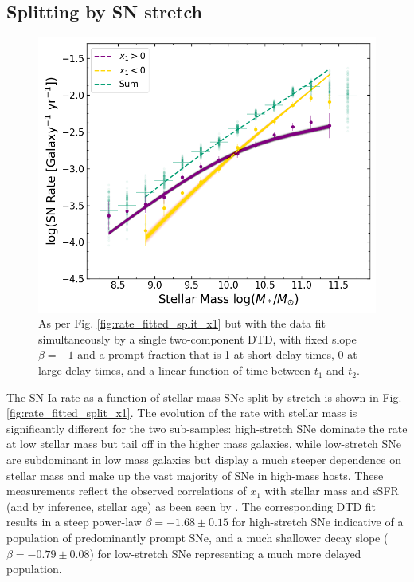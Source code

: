 \documentclass[fleqn,usenatbib]{mnras}
\begin{document}
\subsection{Splitting by SN stretch \label{subsec:split_x1}}

\begin{figure}
    \centering
    \includegraphics[width=.5\textwidth]{figs/rate_vs_mass_DTD_fit_beta_norm_Qerf1.1_split_x1_fitjoint.png}
    \caption{As per Fig. \ref{fig:rate_fitted_split_x1} but with the data fit simultaneously by a single two-component DTD, with fixed slope $\beta = -1$ and a prompt fraction that is 1 at short delay times, 0 at large delay times, and a linear function of time between $t_1$ and $t_2$.%
    \label{fig:rate_fitted_split_x1_2c_DTD}}
\end{figure}
The SN Ia rate as a function of stellar mass SNe split by stretch is shown in Fig. \ref{fig:rate_fitted_split_x1}. The evolution of the rate with stellar mass is significantly different for the two sub-samples: high-stretch SNe dominate the rate at low stellar mass but tail off in the higher mass galaxies, while low-stretch SNe are subdominant in low mass galaxies but display a much steeper dependence on stellar mass and make up the vast majority of SNe in high-mass hosts. These measurements reflect the observed correlations of $x_1$ with stellar mass and sSFR (and by inference, stellar age) as been seen by \citet{Rigault2013,Rigault2018,Nicolas2020}. The corresponding DTD fit results in a steep power-law $\beta = -1.68 \pm 0.15$ for high-stretch SNe indicative of a population of predominantly prompt SNe, and a much shallower decay slope ($\beta = -0.79 \pm 0.08$) for low-stretch SNe representing a much more delayed population. 
\end{document}
